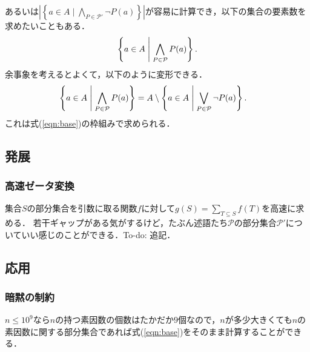 \documentclass{jsarticle}
\begin{document}
あるいは$\left|\left\{a\in A\mid\bigwedge_{P\in\mathcal{P}'}\neg P(a)\right\}\right|$が容易に計算でき，以下の集合の要素数を求めたいこともある．
\[\left\{a\in A\Biggm| \bigwedge_{P\in\mathcal{P}} P(a)\right\}.\]
余事象を考えるとよくて，以下のように変形できる．
\begin{align*}
  \left\{a\in A\Biggm| \bigwedge_{P\in\mathcal{P}} P(a)\right\}
  &= A \setminus \left\{a\in A\Biggm| \bigvee_{P\in\mathcal{P}} \neg P(a)\right\}.
\end{align*}
これは式(\ref{eqn:base})の枠組みで求められる．

\subsection{発展}
\subsubsection{高速ゼータ変換}
集合$S$の部分集合を引数に取る関数$f$に対して$g(S)=\sum_{T\subseteq S} f(T)$を高速に求める．
若干ギャップがある気がするけど，たぶん述語たち$\mathcal{P}$の部分集合$\mathcal{P}'$についていい感じのことができる．To-do: 追記．

\subsection{応用}
\subsubsection{暗黙の制約}
$n\le 10^9$なら$n$の持つ素因数の個数はたかだか$9$個なので，$n$が多少大きくても$n$の素因数に関する部分集合であれば式(\ref{eqn:base})をそのまま計算することができる．
\end{document}
